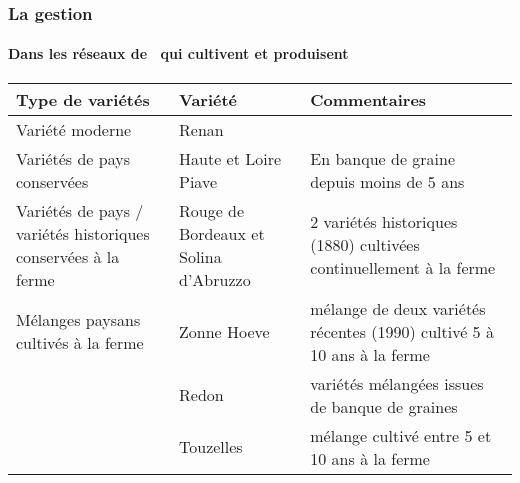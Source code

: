 %
%
%
%


\begin{frame}
\frametitle{La gestion \insitu}
\framesubtitle{Dans les réseaux de \MSPs~qui cultivent et produisent}


\begin{tabular}{ p{} p{} p{} }
\hline
Type de variétés & Variété & Commentaires \\
\hline
Variété moderne & Renan & \\

\hline
Variétés de pays conservées \exsitu 	& Haute et Loire Piave		& En banque de graine depuis moins de 5 ans \\

\hline
Variétés de pays / variétés historiques conservées à la ferme 	& Rouge de Bordeaux et Solina d'Abruzzo & 2 variétés historiques (1880) cultivées continuellement à la ferme \\
															
\hline
Mélanges paysans cultivés à la ferme 	& Zonne Hoeve  	& mélange de deux variétés récentes (1990) cultivé 5 à 10 ans à la ferme \\
									& Redon 		& variétés mélangées issues de banque de graines \\
									& Touzelles 	& mélange cultivé entre 5 et 10 ans à la ferme \\
\hline
\end{tabular}


\end{frame}


